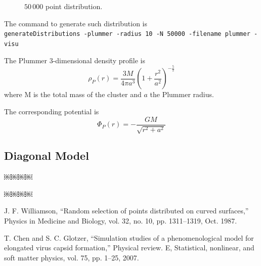 \documentclass[10pt]{article}
\begin{document}
\begin{figure}[h]
\begin{minipage}{0.45\textwidth}
    \caption{$50\,000$ point distribution.}%
      \end{minipage}%

\end{figure}

The command to generate such distribution is\\
\texttt{generateDistributions -plummer -radius 10   -N 50000 -filename plummer  -visu} 



The Plummer 3-dimensional density profile is 
\begin{equation}
\rho_P(r) = \frac{3 M}{4\pi a^3} (1+\frac{r^2}{a^2})^{-\frac{5}{2}}
\end{equation}
where M is the total mass of the cluster and $a$ the Plummer radius. 

The corresponding potential is 
\begin{equation}
\Phi_P(r) = - \frac{G M}{\sqrt{r^2+a^2}}
\end{equation}
\subsection{Diagonal Model}


  ￼￼￼￼


  ￼￼￼￼
\newpage
\begin{thebibliography}{1}
 J. F. Williamson, “Random selection of points distributed on curved surfaces,” Physics in Medicine and Biology, vol. 32, no. 10, pp. 1311–1319, Oct. 1987.

 T. Chen and S. C. Glotzer, “Simulation studies of a phenomenological model for elongated virus capsid formation,” Physical review. E, Statistical, nonlinear, and soft matter physics, vol. 75, pp. 1–25, 2007.

\end{thebibliography}
\end{document}
